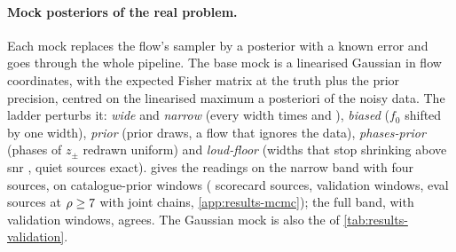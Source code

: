 \paragraph{Mock posteriors of the real problem.}
\label{app:evaluation-mocks}
Each mock replaces the flow's sampler by a posterior with a known error and goes through the whole pipeline. The base mock is a
linearised Gaussian in flow coordinates, with the expected Fisher matrix at the truth plus the prior precision, centred
on the linearised maximum a posteriori of the noisy data. The ladder perturbs it: \emph{wide} and \emph{narrow} (every
width times \EvaluationMockWide{} and \EvaluationMockNarrow), \emph{biased} ($f_0$ shifted by one width), \emph{prior}
(prior draws, a flow that ignores the data), \emph{phases-prior} (phases of $z_\pm$ redrawn uniform) and
\emph{loud-floor} (widths that stop shrinking above \ac{snr} \EvaluationMockFloorSnr{}, quiet sources exact).
 gives the readings on the narrow band with four sources, on catalogue-prior windows
(\EvaluationMockScorecardSources{} scorecard sources, \EvaluationMockInjections{} validation windows,
\EvaluationMockReferenceSources{} eval sources at $\rho\ge7$ with joint chains,
\cref{app:results-mcmc}); the full band, with \EvaluationMockInjectionsFull{} validation windows, agrees. The Gaussian
mock is also the  of \cref{tab:results-validation}.


